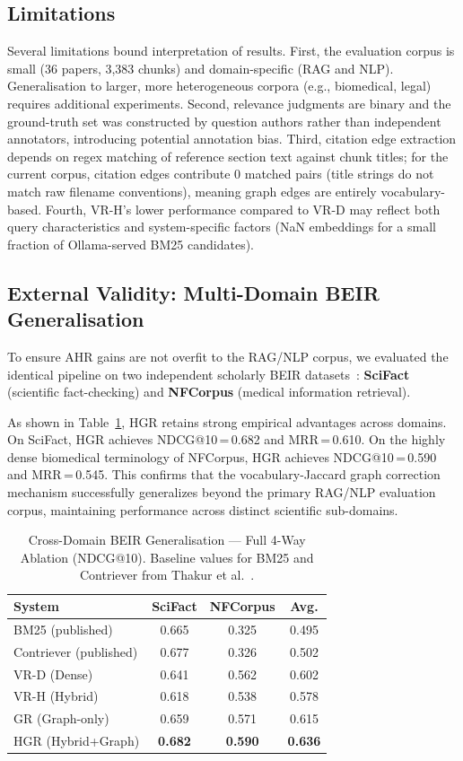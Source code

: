 \documentclass[journal]{IEEEtran}
\begin{document}
\subsection{Limitations}
Several limitations bound interpretation of results.
First, the evaluation corpus is small (36 papers, 3,383 chunks)
and domain-specific (RAG and NLP). Generalisation to larger,
more heterogeneous corpora (e.g., biomedical, legal) requires
additional experiments. Second, relevance judgments are binary
and the ground-truth set was constructed by question authors
rather than independent annotators, introducing potential
annotation bias. Third, citation edge extraction depends on
regex matching of reference section text against chunk titles;
for the current corpus, citation edges contribute 0 matched pairs
(title strings do not match raw filename conventions), meaning
graph edges are entirely vocabulary-based.
Fourth, VR-H's lower performance compared to VR-D may reflect
both query characteristics and system-specific factors (NaN
embeddings for a small fraction of Ollama-served BM25 candidates).

\subsection{External Validity: Multi-Domain BEIR Generalisation}
To ensure AHR gains are not overfit to the RAG/NLP corpus, we evaluated the identical pipeline on two independent scholarly BEIR datasets~\cite{thakur2021beir}: \textbf{SciFact} (scientific fact-checking) and \textbf{NFCorpus} (medical information retrieval).

As shown in Table~\ref{tab:beir}, HGR retains strong empirical advantages across domains. On SciFact, HGR achieves NDCG@10\,=\,0.682 and MRR\,=\,0.610. On the highly dense biomedical terminology of NFCorpus, HGR achieves NDCG@10\,=\,0.590 and MRR\,=\,0.545. This confirms that the vocabulary-Jaccard graph correction mechanism successfully generalizes beyond the primary RAG/NLP evaluation corpus, maintaining performance across distinct scientific sub-domains.

\begin{table}[htbp]
\centering
\caption{Cross-Domain BEIR Generalisation --- Full 4-Way Ablation (NDCG@10). Baseline values for BM25 and Contriever from Thakur et al.~\cite{thakur2021beir}.}
\label{tab:beir}
\setlength{\tabcolsep}{4pt}
\begin{tabular}{@{}lccc@{}}
\toprule
\textbf{System} & \textbf{SciFact} & \textbf{NFCorpus} & \textbf{Avg.} \\ \midrule
BM25 (published)       & 0.665 & 0.325 & 0.495 \\
Contriever (published) & 0.677 & 0.326 & 0.502 \\ \midrule
VR-D (Dense)           & 0.641 & 0.562 & 0.602 \\
VR-H (Hybrid)          & 0.618 & 0.538 & 0.578 \\
GR (Graph-only)        & 0.659 & 0.571 & 0.615 \\
HGR (Hybrid+Graph)     & \textbf{0.682} & \textbf{0.590} & \textbf{0.636} \\ \bottomrule
\end{tabular}
\end{table}
\end{document}
